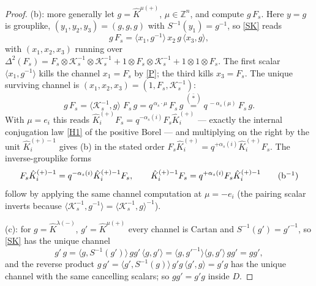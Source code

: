 \documentclass[11pt]{article}
\theoremstyle{definition}
\theoremstyle{remark}
\newcommand{\la}{\langle}
\newcommand{\ra}{\rangle}
\newcommand{\Z}{\mathbb{Z}}
\newcommand{\hK}{\hat K}
\newcommand{\cK}{\mathcal K}
\begin{document}
\begin{proof}
(b): more generally let $g=\hK^{\mu(+)}$, $\mu\in\Z^n$, and compute
$g\,F_s$.  Here $y=g$ is grouplike,
$(y_1,y_2,y_3)=(g,g,g)$ with $S^{-1}(y_1)=g^{-1}$, so \eqref{SK} reads
\[
g\,F_s=\la x_1,g^{-1}\ra\,x_2\,g\,\la x_3,g\ra ,
\]
with $(x_1,x_2,x_3)$ running over
$\Delta^2(F_s)=F_s\otimes\cK_s^{-1}\otimes\cK_s^{-1}
+1\otimes F_s\otimes\cK_s^{-1}+1\otimes1\otimes F_s$.
The first scalar $\la x_1,g^{-1}\ra$ kills the channel $x_1=F_s$
by \eqref{P}; the third kills $x_3=F_s$.  The unique surviving
channel is $(x_1,x_2,x_3)=(1,F_s,\cK_s^{-1})$:
\[
g\,F_s=\la\cK_s^{-1},g\ra\;F_s\,g
=q^{\,\alpha_s\cdot\mu}\,F_s\,g
\overset{(\bar\ast)}{=}q^{\,-\alpha_s(\mu)}\,F_s\,g .
\]
With $\mu=e_i$ this reads
$\hK_i^{(+)}F_s=q^{-\alpha_s(i)}F_s\hK_i^{(+)}$ — exactly the
internal conjugation law \eqref{H1} of the positive Borel — and
multiplying on the right by the unit $\hK_i^{(+)-1}$ gives (b) in the
stated order
$F_s\hK_i^{(+)}=q^{+\alpha_s(i)}\hK_i^{(+)}F_s$.
The inverse-grouplike forms
\begin{equation}
F_s\hK_i^{(+)-1}=q^{-\alpha_s(i)}\hK_i^{(+)-1}F_s,\qquad
\hK_i^{(+)-1}F_s=q^{+\alpha_s(i)}F_s\hK_i^{(+)-1}
\label{bInv}\tag{b$^{-1}$}
\end{equation}
follow by applying the same channel computation at $\mu=-e_i$ (the
pairing scalar inverts because
$\la\cK_s^{-1},g^{-1}\ra=\la\cK_s^{-1},g\ra^{-1}$).

(c): for $g=\hK^{\lambda(-)}$, $g'=\hK^{\mu(+)}$ every channel is
Cartan and $S^{-1}(g')=g'^{-1}$, so \eqref{SK} has the unique channel
\[
g'\,g=\la g,S^{-1}(g')\ra\,gg'\,\la g,g'\ra
=\la g,g'^{-1}\ra\la g,g'\ra\,gg'=gg',
\]
and the reverse product $g\,g'=\la g',S^{-1}(g)\ra\,g'g\,\la g',g\ra=g'g$
has the unique channel with the same cancelling scalars; so
$gg'=g'g$ inside $D$.
\end{proof}
\end{document}
